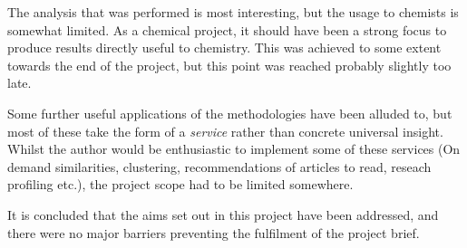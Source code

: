 The analysis that was performed is most interesting, but the usage to chemists is somewhat limited. As a chemical project, it should have been a strong focus to produce results directly useful to chemistry. This was achieved to some extent towards the end of the project, but this point was reached probably slightly too late.

Some further useful applications of the methodologies have been alluded to, but most of these take the form of a \emph{service} rather than concrete universal insight. Whilst the author would be enthusiastic to implement some of these services (On demand similarities, clustering, recommendations of articles to read, reseach profiling etc.), the project scope had to be limited somewhere.

It is concluded that the aims set out in this project have been addressed, and there were no major barriers preventing the fulfilment of the project brief. 